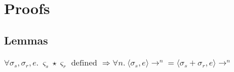 \section{Proofs}

\subsection{Lemmas}

\subsubsection{$
    \forall \sigma_s, \sigma_r, e.\ \varsigma_s \star \varsigma_r \textrm{ defined }
    \Rightarrow \forall n.\ \langle \sigma_s, e \rangle \rightarrow^n =
    \langle \sigma_s + \sigma_r , e \rangle \rightarrow^n
$}\label{frame}

